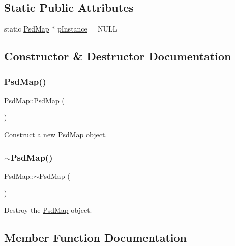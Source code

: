\subsection*{Static Public Attributes}
\begin{DoxyCompactItemize}
\item 
static \hyperlink{class_psd_map}{Psd\+Map} $\ast$ \hyperlink{class_psd_map_a9d0824203886b61bfea66530e401dcd1}{p\+Instance} = N\+U\+LL
\end{DoxyCompactItemize}


\subsection{Constructor \& Destructor Documentation}
\mbox{\label{class_psd_map_a0f0d7e4f35c32b85cc855b375bfdf6f1}} 
\subsubsection{\texorpdfstring{Psd\+Map()}{PsdMap()}}
{\footnotesize\ttfamily Psd\+Map\+::\+Psd\+Map (\begin{DoxyParamCaption}{ }\end{DoxyParamCaption})}



Construct a new \hyperlink{class_psd_map}{Psd\+Map} object. 

\mbox{\label{class_psd_map_a027edc72c34c1d7845385bb57bff0956}} 
\subsubsection{\texorpdfstring{$\sim$\+Psd\+Map()}{~PsdMap()}}
{\footnotesize\ttfamily Psd\+Map\+::$\sim$\+Psd\+Map (\begin{DoxyParamCaption}{ }\end{DoxyParamCaption})}



Destroy the \hyperlink{class_psd_map}{Psd\+Map} object. 



\subsection{Member Function Documentation}
\mbox{\label{class_psd_map_a32a4312f48a064153216831d5b0beb41}} 
